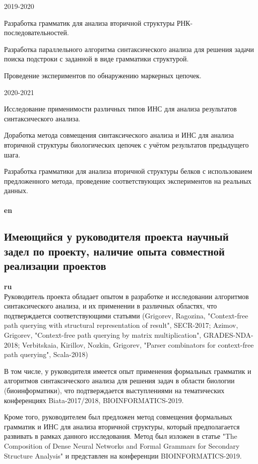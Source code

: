 \documentclass[12pt]{article}  %
\theoremstyle{remark}
\begin{document}
2019-2020

Разработка грамматик для анализа вторичной структуры РНК-последовательностей.

Разработка параллельного алгоритма синтаксического анализа для решения задачи поиска подстроки с заданной в виде грамматики структурой.

Проведение экспериментов по обнаружению маркерных цепочек.

2020-2021

Исследование применимости различных типов ИНС для анализа результатов синтаксического анализа.

Доработка метода совмещения синтаксического анализа и ИНС для анализа вторичной структуры биологических цепочек с учётом результатов предыдущего шага.

Разработка грамматики для анализа вторичной структуры белков с использоваием предложенного метода, проведение соответствующих экспериментов на реальных данных.
\\
\\
\textbf{en}\\



\subsection{Имеющийся у руководителя проекта научный задел по проекту, наличие опыта совместной реализации проектов}

\textbf{ru}\\
Руководитель проекта обладает опытом в разработке и исследовании алгоритмов синтаксического анализа, и их применении в различных областях, что подтверждается соответствующими статьями (Grigorev, Ragozina, "Context-free path querying with structural representation of result", SECR-2017; Azimov, Grigorev, "Context-free path querying by matrix multiplication", GRADES-NDA-2018; Verbitskaia, Kirillov, Nozkin, Grigorev, "Parser combinators for context-free path querying", Scala-2018)

В том числе, у руководителя имеется опыт применения формальных грамматик и алгоритмов синтаксического анализа для решения задач в области биологии (биоинформатики), что подтверждается выступлениями на тематических конференциях Biata-2017/2018, BIOINFORMATICS-2019.

Кроме того, руководителем был предложен метод совмещения формальных грамматик и ИНС для анализа вторичной структуры, который предполагается развивать в рамках данного исследования. Метод был изложен в статье "The Composition of Dense Neural Networks and Formal Grammars for Secondary Structure Analysis" и представлен на конференции BIOINFORMATICS-2019.
\end{document}
